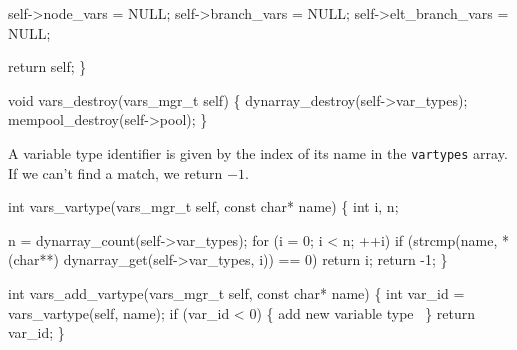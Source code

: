     self->node_vars   = NULL;
    self->branch_vars = NULL;
    self->elt_branch_vars = NULL;

    return self;
\}

\nwendcode{}\nwdocspar

\nwenddocs{}\plusendmoddef
void vars_destroy(vars_mgr_t self)
\{
    dynarray_destroy(self->var_types);
    mempool_destroy(self->pool);
\}

\nwendcode{}\nwdocspar


A variable type identifier is given by the index of its name
in the {\tt{}var{}types} array.  If we can't find a match, %
we return $-1$.

\nwenddocs{}\plusendmoddef
int vars_vartype(vars_mgr_t self, const char* name)
\{
    int i, n;

    n = dynarray_count(self->var_types);
    for (i = 0; i < n; ++i)
        if (strcmp(name, *(char**) dynarray_get(self->var_types, i)) == 0)
            return i;
    return -1;
\}

\nwendcode{}\nwdocspar

\nwenddocs{}\plusendmoddef
int vars_add_vartype(vars_mgr_t self, const char* name)
\{
    int var_id = vars_vartype(self, name);
    if (var_id < 0) \{
        \LA{}add new variable type~{\nwtagstyle{}}\RA{}
    \}
    return var_id;
\}

